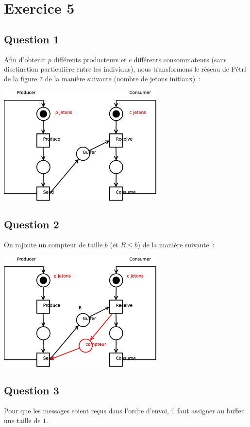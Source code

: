 \section*{Exercice 5}

\subsection*{Question 1}
Afin d'obtenir $p$ différents producteurs et $c$ différents
consommateurs (sans disctinction particulière entre les individus),
nous transformons le réseau de Pétri de la figure $7$ de la manière
suivante (nombre de jetons initiaux)~:

\begin{center}
\includegraphics[height=6cm]{exo5_1.eps}
\end{center}

\subsection*{Question 2}

On rajoute un compteur de taille $b$ (et $B \leq b$) de la manière
suivante~:

\begin{center}
\includegraphics[height=6cm]{exo5_2.eps}
\end{center}

\subsection*{Question 3}

Pour que les messages soient reçus dans l'ordre d'envoi, il faut assigner au buffer une taille de $1$.
